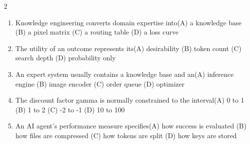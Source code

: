 \documentclass[a4paper]{article}
\begin{document}
\begin{multicols*}{2}
\begin{enumerate}[resume]
\item Knowledge engineering converts domain expertise into\newline\hspace*{0.6em}(A) a knowledge base \quad (B) a pixel matrix \newline\hspace*{0.6em}(C) a routing table \quad (D) a loss curve
\item The utility of an outcome represents its\newline\hspace*{0.6em}(A) desirability \quad (B) token count \newline\hspace*{0.6em}(C) search depth \quad (D) probability only
\item An expert system usually contains a knowledge base and an\newline\hspace*{0.6em}(A) inference engine \quad (B) image encoder \newline\hspace*{0.6em}(C) order queue \quad (D) optimizer
\item The discount factor gamma is normally constrained to the interval\newline\hspace*{0.6em}(A) 0 to 1 \quad (B) 1 to 2 \newline\hspace*{0.6em}(C) -2 to -1 \quad (D) 10 to 100
\item An AI agent's performance measure specifies\newline\hspace*{0.6em}(A) how success is evaluated \quad (B) how files are compressed \newline\hspace*{0.6em}(C) how tokens are split \quad (D) how keys are stored
\end{enumerate}
\end{multicols*}
\end{document}
